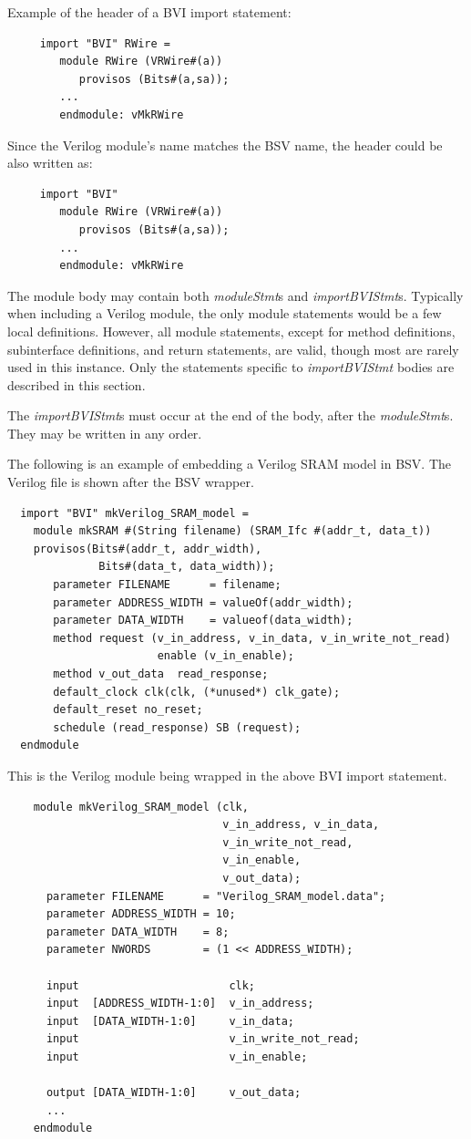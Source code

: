 \documentclass[twoside,letterpaper]{article}
\newcommand{\V}{Verilog}
\newcommand{\nterm}[1]{\emph{#1}}
\begin{document}
Example of the header of a BVI import statement:
\begin{verbatim}
     import "BVI" RWire = 
        module RWire (VRWire#(a))
           provisos (Bits#(a,sa));
        ...
        endmodule: vMkRWire
\end{verbatim}

Since the {\V} module's name matches the BSV name, the header could
be also written as:

\begin{verbatim}
     import "BVI" 
        module RWire (VRWire#(a))
           provisos (Bits#(a,sa));
        ...
        endmodule: vMkRWire
\end{verbatim}


The module body may contain both \nterm{moduleStmt}s and
\nterm{importBVIStmt}s.  Typically when including a {\V} module, the
only module statements would be a few local definitions.  
However, all module statements, except for 
method definitions,  subinterface definitions, and return statements, are
valid, though most are rarely used in this instance. Only the statements specific to \nterm{importBVIStmt} bodies are
described in  this section. 

The \nterm{importBVIStmt}s must occur at the end of the body, after
the \nterm{moduleStmt}s.  
They may be written in any order. 



The following is an example of embedding a Verilog SRAM model in BSV.
The  Verilog file is
shown after the BSV wrapper.
\begin{verbatim}
  import "BVI" mkVerilog_SRAM_model =
    module mkSRAM #(String filename) (SRAM_Ifc #(addr_t, data_t))
    provisos(Bits#(addr_t, addr_width),
              Bits#(data_t, data_width));
       parameter FILENAME      = filename;
       parameter ADDRESS_WIDTH = valueOf(addr_width);
       parameter DATA_WIDTH    = valueof(data_width);
       method request (v_in_address, v_in_data, v_in_write_not_read)
                       enable (v_in_enable);
       method v_out_data  read_response;
       default_clock clk(clk, (*unused*) clk_gate);
       default_reset no_reset;
       schedule (read_response) SB (request);
  endmodule  
\end{verbatim}
This is the Verilog module being wrapped in the above BVI import statement.
\begin{verbatim}
    module mkVerilog_SRAM_model (clk,
                                 v_in_address, v_in_data,
                                 v_in_write_not_read, 
                                 v_in_enable,
                                 v_out_data);
      parameter FILENAME      = "Verilog_SRAM_model.data";
      parameter ADDRESS_WIDTH = 10;
      parameter DATA_WIDTH    = 8;
      parameter NWORDS        = (1 << ADDRESS_WIDTH);
    
      input                       clk;
      input  [ADDRESS_WIDTH-1:0]  v_in_address;
      input  [DATA_WIDTH-1:0]     v_in_data;
      input                       v_in_write_not_read;
      input                       v_in_enable;
    
      output [DATA_WIDTH-1:0]     v_out_data;
      ...
    endmodule
\end{verbatim}
\end{document}
